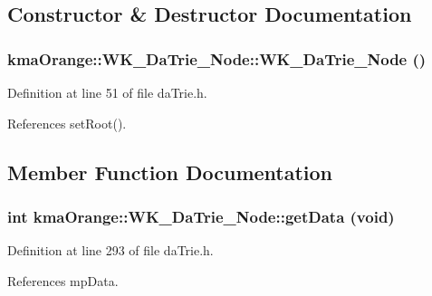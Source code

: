 \subsection{Constructor \& Destructor Documentation}
\hypertarget{classkmaOrange_1_1WK__DaTrie__Node_b489b164b42cde72d1237b36682a5417}{
\subsubsection[{WK\_\-DaTrie\_\-Node}]{\setlength{\rightskip}{0pt plus 5cm}kmaOrange::WK\_\-DaTrie\_\-Node::WK\_\-DaTrie\_\-Node ()}}
\label{classkmaOrange_1_1WK__DaTrie__Node_b489b164b42cde72d1237b36682a5417}




Definition at line 51 of file daTrie.h.

References setRoot().

\subsection{Member Function Documentation}
\hypertarget{classkmaOrange_1_1WK__DaTrie__Node_d1035d188f70a5f3911aa553c48c07e4}{
\subsubsection[{getData}]{\setlength{\rightskip}{0pt plus 5cm}int kmaOrange::WK\_\-DaTrie\_\-Node::getData (void)}}
\label{classkmaOrange_1_1WK__DaTrie__Node_d1035d188f70a5f3911aa553c48c07e4}




Definition at line 293 of file daTrie.h.

References mpData.

